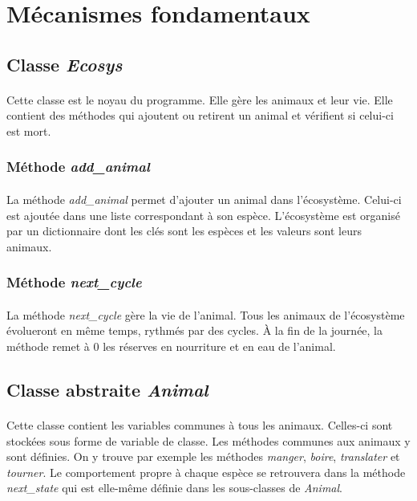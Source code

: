 \documentclass[a4paper,11pt,final,oneside]{article}
\begin{document}
	\section{Mécanismes fondamentaux}
	\label{sec:mec}
	
		\subsection{Classe \textit{Ecosys}}
		
\paragraph{} Cette classe est le noyau du programme. Elle gère les animaux et leur vie. Elle contient des méthodes qui ajoutent ou retirent un animal et vérifient si celui-ci est mort.

			\subsubsection{Méthode \textit{add\_animal}}

\paragraph{} La méthode \textit{add\_animal} permet d'ajouter un animal dans l'écosystème. Celui-ci est ajoutée dans une liste correspondant à son espèce. L'écosystème est organisé par un dictionnaire dont les clés sont les espèces et les valeurs sont leurs animaux.

			\subsubsection{Méthode \textit{next\_cycle}}

\paragraph{} La méthode \textit{next\_cycle} gère la vie de l'animal. Tous les animaux de l'écosystème évolueront en même temps, rythmés par des cycles. À la fin de la journée, la méthode remet à 0 les réserves en nourriture et en eau de l'animal.

		\subsection{Classe abstraite \textit{Animal}}
		
\paragraph{} Cette classe contient les variables communes à tous les animaux. Celles-ci sont stockées sous forme de variable de classe. Les méthodes communes aux animaux y sont définies. On y trouve par exemple les méthodes \textit{manger}, \textit{boire}, \textit{translater} et \textit{tourner}. Le comportement propre à chaque espèce se retrouvera dans la méthode \textit{next\_state} qui est elle-même définie dans les sous-classes de \textit{Animal}.
\end{document}
